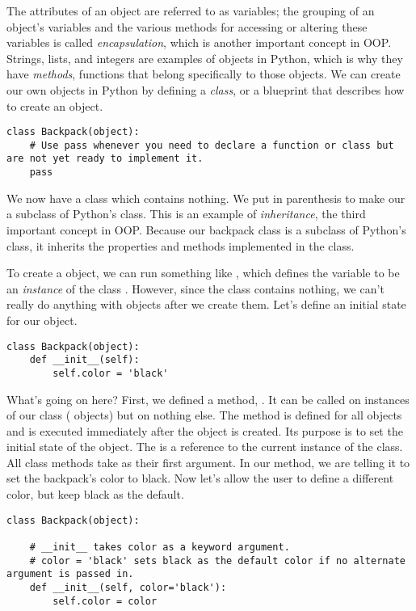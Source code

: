 The attributes of an object are referred to as variables; the grouping of an object's variables and the various methods for accessing or altering these variables is called \emph{encapsulation}, which is another important concept in OOP.
Strings, lists, and integers are examples of objects in Python, which is why they have \emph{methods}, functions that belong specifically to those objects.
We can create our own objects in Python by defining a \emph{class}, or a blueprint that describes how to create an object.

\begin{lstlisting}
class Backpack(object):
	# Use pass whenever you need to declare a function or class but are not yet ready to implement it.
	pass
\end{lstlisting}

We now have a class  which contains nothing.
We put  in parenthesis to make our  a subclass of Python's  class.
This is an example of \emph{inheritance}, the third important concept in OOP.
Because our backpack class is a subclass of Python's  class, it inherits the properties and methods implemented in the  class.

To create a  object, we can run something like , which defines the variable  to be an \emph{instance} of the class . However, since the class contains nothing, we can't really do anything with  objects after we create them.
Let's define an initial state for our object.

\begin{lstlisting}
class Backpack(object):
    def __init__(self):
        self.color = 'black'
\end{lstlisting}

What's going on here?
First, we defined a method, .
It can be called on instances of our class ( objects) but on nothing else.
The  method is defined for all objects and is executed immediately after the object is created.
Its purpose is to set the initial state of the object.
The  is a reference to the current instance of the class.
All class methods take  as their first argument.
In our  method, we are telling it to set the backpack's color to black.
Now let's allow the user to define a different color, but keep black as the default.

\begin{lstlisting}
class Backpack(object):

    # __init__ takes color as a keyword argument.
    # color = 'black' sets black as the default color if no alternate argument is passed in.
    def __init__(self, color='black'):
        self.color = color
\end{lstlisting}

